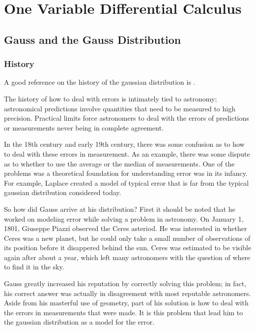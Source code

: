 \section{One Variable Differential Calculus}

\subsection{Gauss and the Gauss Distribution}

\subsubsection*{History}

A good reference on the history of the gaussian distribution is \cite{gaussian}.

The history of how to deal with errors is intimately tied to astronomy; astronomical predictions involve quantities that need to be measured to high precision. 
Practical limits force astronomers to deal with the errors of predictions or measurements never being in complete agreement.

In the 18th century and early 19th century, there was some confusion as to how to deal with these errors in measurement. 
As an example, there was some dispute as to whether to use the average or the median of measurements. 
One of the problems was a theoretical foundation for understanding error was in its infancy. 
For example, Laplace created a model of typical error that is far from the typical gaussian distribution considered today.

So how did Gauss arrive at his distribution? First it should be noted that he worked on modeling error while solving a problem in astronomy. 
On January 1, 1801, Giuseppe Piazzi observed the Ceres asteriod. 
He was interested in whether Ceres was a new planet, but he could only take a small number of observations of its position before it disappered behind the sun. 
Ceres was estimated to be visible again after about a year, which left many astronomers with the question of where to find it in the sky.

Gauss greatly increased his reputation by correctly solving this problem; in fact, his correct answer was actually in disagreement with most reputable astronomers. 
Aside from his masterful use of geometry, part of his solution is how to deal with the errors in measurements that were made. 
It is this problem that lead him to the gaussian distribution as a model for the error.

